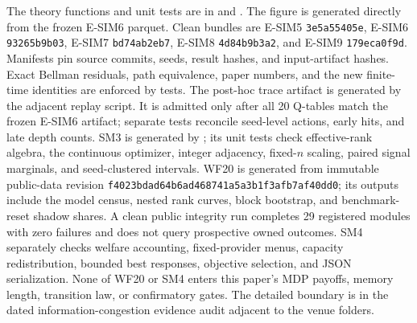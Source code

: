 \documentclass[10pt,twocolumn]{article}
\begin{document}
The theory functions and unit tests are in
 and
.  The figure is generated
directly from the frozen E-SIM6 parquet.  Clean bundles are E-SIM5
\texttt{3e5a55405e}, E-SIM6 \texttt{93265b9b03}, E-SIM7
\texttt{bd74ab2eb7}, E-SIM8 \texttt{4d84b9b3a2}, and E-SIM9
\texttt{179eca0f9d}.  Manifests pin source commits, seeds, result hashes, and
input-artifact hashes.  Exact Bellman residuals, path equivalence, paper
numbers, and the new finite-time identities are enforced by tests.
The post-hoc trace artifact
 is generated by the adjacent
replay script.  It is admitted only after all 20 Q-tables match the frozen
E-SIM6 artifact; separate tests reconcile seed-level actions, early hits, and
late depth counts.
SM3 is generated by
; its unit tests
check effective-rank algebra, the continuous optimizer, integer adjacency,
fixed-$n$ scaling, paired signal marginals, and seed-clustered intervals.  WF20
is generated from immutable public-data revision
\texttt{f4023bdad64b6ad468741a5a3b1f3afb7af40dd0}; its outputs include the
model census, nested rank curves, block bootstrap, and benchmark-reset shadow
shares.  A clean public integrity run completes 29 registered modules with zero
failures and does not query prospective owned outcomes.  SM4 separately checks
welfare accounting, fixed-provider menus, capacity redistribution, bounded
best responses, objective selection, and JSON serialization.  None of WF20 or
SM4 enters this paper's MDP payoffs, memory length, transition law, or
confirmatory gates.  The detailed boundary is in
the dated information-congestion evidence audit adjacent to the venue folders.


\begingroup
\scriptsize
\setlength{\bibsep}{0pt plus 0.3ex}

\endgroup
\end{document}

